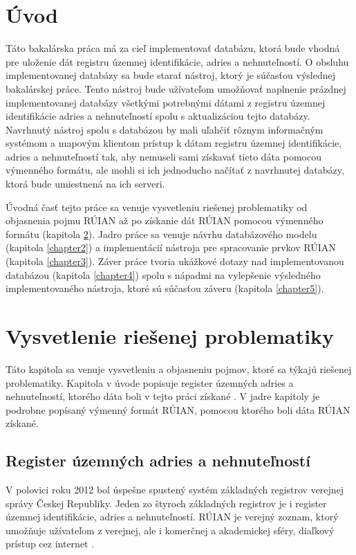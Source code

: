 \chapter{Úvod}

Táto bakalárska práca má za cieľ implementovať databázu, ktorá bude vhodná pre uloženie dát registru územnej identifikácie, adries a nehnuteľností. O obsluhu implementovanej databázy sa bude starať nástroj, ktorý je súčasťou výslednej bakalárskej práce. Tento nástroj bude užívateľom umožňovať naplnenie prázdnej implementovanej databázy všetkými potrebnými dátami z registru územnej identifikácie adries a nehnuteľností spolu s aktualizáciou tejto databázy. Navrhnutý nástroj spolu s databázou by mali uľahčiť rôznym informačným systémom a mapovým klientom prístup k dátam registru územnej identifikácie, adries a nehnuteľností tak, aby nemuseli sami získavať tieto dáta pomocou výmenného formátu, ale mohli si ich jednoducho načítať z navrhnutej databázy, ktorá bude  umiestnená na ich serveri.

Úvodná časť tejto práce sa venuje vysvetleniu riešenej problematiky od objasnenia pojmu RÚIAN až po získanie dát RÚIAN pomocou výmenného formátu (kapitola \ref{chapter1}). Jadro práce sa venuje návrhu databázového modelu (kapitola \ref{chapter2}) a implementácií nástroja pre spracovanie prvkov RÚIAN (kapitola \ref{chapter3}). Záver práce tvoria ukážkové dotazy nad implementovanou databázou (kapitola \ref{chapter4}) spolu s nápadmi na vylepšenie výsledného implementovaného nástroja, ktoré sú súčasťou záveru (kapitola \ref{chapter5}). 
\chapter {Vysvetlenie riešenej problematiky}
\label{chapter1}
Táto kapitola sa venuje vysvetleniu a objasneniu pojmov, ktoré sa týkajú riešenej problematiky. Kapitola v úvode popisuje register územných adries a nehnuteľností, ktorého dáta boli v tejto práci získané . V jadre kapitoly je podrobne popísaný výmenný formát RÚIAN, pomocou ktorého boli dáta RÚIAN získané.
\section{Register územných adries a nehnuteľností}
V polovici roku 2012 bol úspešne spustený systém základných registrov verejnej správy Českej Republiky. Jeden zo štyroch základných registrov je i register územnej identifikácie, adries a nehnuteľností. RÚIAN  je verejný zoznam, ktorý umožňuje užívateľom z verejnej, ale i komerčnej a akademickej sféry, diaľkový prístup cez internet \cite{Ruian}.
\label{struktura}
